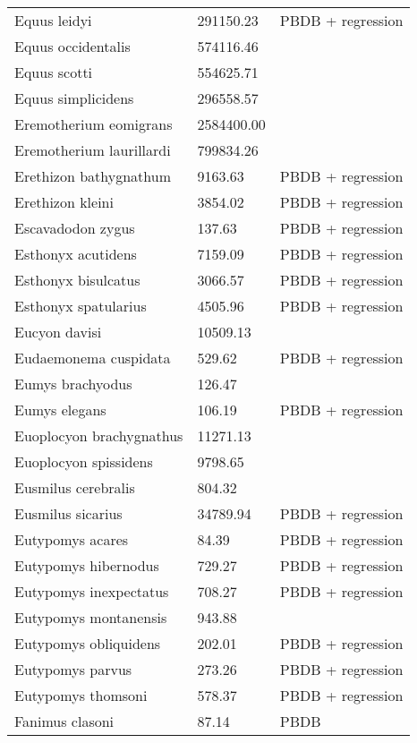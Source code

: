 \documentclass{article}
\begin{document}
\begin{center}
\begin{longtable}{p{} p{} p{} }
  Equus leidyi & 291150.23 & PBDB + regression \\ 
  Equus occidentalis & 574116.46 & \cite{Smith2004} \\ 
  Equus scotti & 554625.71 & \cite{Smith2004} \\ 
  Equus simplicidens & 296558.57 & \cite{Tomiya2013} \\ 
  Eremotherium eomigrans & 2584400.00 & \cite{McDonald2005} \\ 
  Eremotherium laurillardi & 799834.26 & \cite{Smith2004} \\ 
  Erethizon bathygnathum & 9163.63 & PBDB + regression \\ 
  Erethizon kleini & 3854.02 & PBDB + regression \\ 
  Escavadodon zygus & 137.63 & PBDB + regression \\ 
  Esthonyx acutidens & 7159.09 & PBDB + regression \\ 
  Esthonyx bisulcatus & 3066.57 & PBDB + regression \\ 
  Esthonyx spatularius & 4505.96 & PBDB + regression \\ 
  Eucyon davisi & 10509.13 & \cite{Tomiya2013} \\ 
  Eudaemonema cuspidata & 529.62 & PBDB + regression \\ 
  Eumys brachyodus & 126.47 & \cite{Tomiya2013} \\ 
  Eumys elegans & 106.19 & PBDB + regression \\ 
  Euoplocyon brachygnathus & 11271.13 & \cite{Tomiya2013} \\ 
  Euoplocyon spissidens & 9798.65 & \cite{Tomiya2013} \\ 
  Eusmilus cerebralis & 804.32 & \cite{Tomiya2013} \\ 
  Eusmilus sicarius & 34789.94 & PBDB + regression \\ 
  Eutypomys acares & 84.39 & PBDB + regression \\ 
  Eutypomys hibernodus & 729.27 & PBDB + regression \\ 
  Eutypomys inexpectatus & 708.27 & PBDB + regression \\ 
  Eutypomys montanensis & 943.88 & \cite{Tomiya2013} \\ 
  Eutypomys obliquidens & 202.01 & PBDB + regression \\ 
  Eutypomys parvus & 273.26 & PBDB + regression \\ 
  Eutypomys thomsoni & 578.37 & PBDB + regression \\ 
  Fanimus clasoni & 87.14 & PBDB \\ 

\end{longtable}
\end{center}
\end{document}
